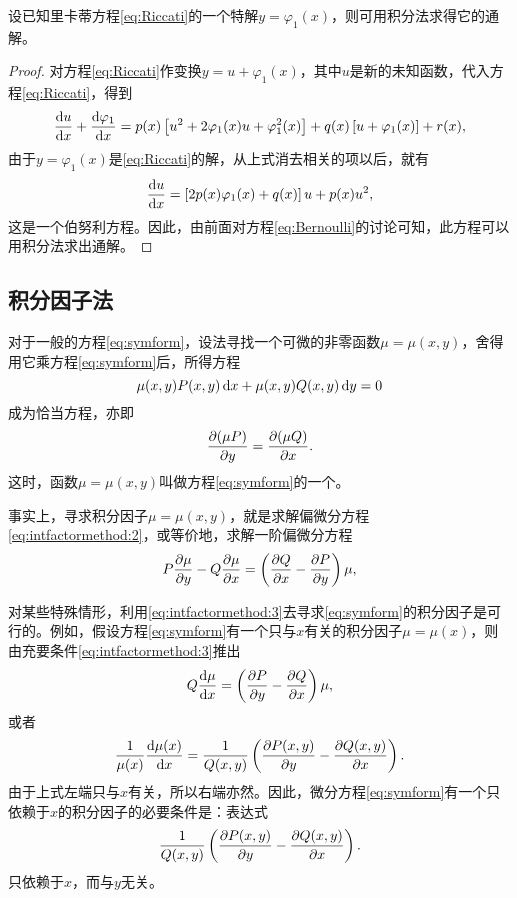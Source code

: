 \begin{theo}\label{theo:Riccati:sol}
设已知里卡蒂方程\eqref{eq:Riccati}的一个特解$y=\varphi_1(x)$，则可用积分法求得它的通解。
\end{theo}
\begin{proof}
对方程\eqref{eq:Riccati}作变换$y=u+\varphi_1(x)$，其中$u$是新的未知函数，代入方程\eqref{eq:Riccati}，得到
\[
\frac{\mathrm{d}{}u}{\mathrm{d}{}x}+\frac{\mathrm{d}{}\varphi_1}{\mathrm{d}{}x}=p(x)\left[u^2+2\varphi_1(x)u+\varphi_1^2(x)\right]+q(x)\left[u+\varphi_1(x)\right]+r(x),
\]
由于$y=\varphi_1(x)$是\eqref{eq:Riccati}的解，从上式消去相关的项以后，就有
\[
\frac{\mathrm{d}{}u}{\mathrm{d}{}x}=\left[2p(x)\varphi_1(x)+q(x)\right]u+p(x)u^2,
\]
这是一个伯努利方程。因此，由前面对方程\eqref{eq:Bernoulli}的讨论可知，此方程可以用积分法求出通解。
\end{proof}

\subsection{积分因子法}
对于一般的方程\eqref{eq:symform}，设法寻找一个可微的非零函数$\mu=\mu(x,y)$，舍得用它乘方程\eqref{eq:symform}后，所得方程
\begin{equation}\label{eq:intfactormethod:1}
\mu(x,y)P(x,y)\,\mathrm{d} x+\mu(x,y)Q(x,y)\,\mathrm{d} y=0
\end{equation}
成为恰当方程，亦即
\begin{equation}\label{eq:intfactormethod:2}
\frac{\partial{}(\mu P)}{\partial{}y}=\frac{\partial{}(\mu Q)}{\partial{}x}.
\end{equation}
这时，函数$\mu=\mu(x,y)$叫做方程\eqref{eq:symform}的一个。

事实上，寻求积分因子$\mu=\mu(x,y)$，就是求解偏微分方程\eqref{eq:intfactormethod:2}，或等价地，求解一阶偏微分方程
\begin{equation}\label{eq:intfactormethod:3}
P\frac{\partial{}\mu}{\partial{}y}-Q\frac{\partial{}\mu}{\partial{}x}=\left(\frac{\partial{}Q}{\partial{}x}-\frac{\partial{}P}{\partial{}y}\right)\mu,
\end{equation}

对某些特殊情形，利用\eqref{eq:intfactormethod:3}去寻求\eqref{eq:symform}的积分因子是可行的。例如，假设方程\eqref{eq:symform}有一个只与$x$有关的积分因子$\mu=\mu(x)$，则由充要条件\eqref{eq:intfactormethod:3}推出
\[
Q\frac{\mathrm{d}{}\mu}{\mathrm{d}{}x}=\left(\frac{\partial{}P}{\partial{}y}-\frac{\partial{}Q}{\partial{}x}\right)\mu,
\]
或者
\begin{equation}\label{eq:intfactormethod:4}
\frac{1}{\mu(x)}\frac{\mathrm{d}{}\mu(x)}{\mathrm{d}{}x}=\frac{1}{Q(x,y)}\left(\frac{\partial{}P(x,y)}{\partial{}y}-\frac{\partial{}Q(x,y)}{\partial{}x}\right).
\end{equation}
由于上式左端只与$x$有关，所以右端亦然。因此，微分方程\eqref{eq:symform}有一个只依赖于$x$的积分因子的必要条件是：表达式
\begin{equation}\label{eq:intfactormethod:5}
\frac{1}{Q(x,y)}\left(\frac{\partial{}P(x,y)}{\partial{}y}-\frac{\partial{}Q(x,y)}{\partial{}x}\right).
\end{equation}
只依赖于$x$，而与$y$无关。

